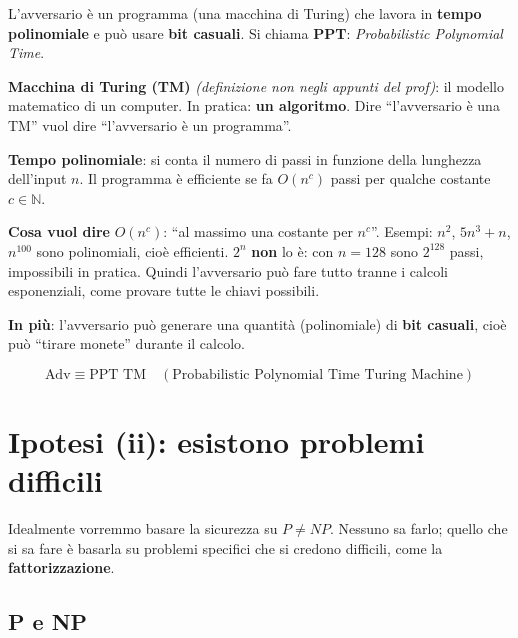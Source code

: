 \begin{inbreve}

L'avversario è un programma (una macchina di Turing) che lavora in \textbf{tempo polinomiale} e può usare \textbf{bit casuali}. Si chiama \textbf{PPT}: \emph{Probabilistic Polynomial Time}.

\end{inbreve}

\textbf{Macchina di Turing (TM)} \emph{(definizione non negli appunti del prof)}: il modello matematico di un computer. In pratica: \textbf{un algoritmo}. Dire ``l'avversario è una TM'' vuol dire ``l'avversario è un programma''.

\textbf{Tempo polinomiale}: si conta il numero di passi in funzione della lunghezza dell'input \(n\). Il programma è efficiente se fa \(O(n^c)\) passi per qualche costante \(c \in \mathbb{N}\).

\begin{nota}

\textbf{Cosa vuol dire} \(O(n^c)\): ``al massimo una costante per \(n^c\)''. Esempi: \(n^2\), \(5n^3 + n\), \(n^{100}\) sono polinomiali, cioè efficienti. \(2^n\) \textbf{non} lo è: con \(n = 128\) sono \(2^{128}\) passi, impossibili in pratica. Quindi l'avversario può fare tutto tranne i calcoli esponenziali, come provare tutte le chiavi possibili.

\end{nota}

\textbf{In più}: l'avversario può generare una quantità (polinomiale) di \textbf{bit casuali}, cioè può ``tirare monete'' durante il calcolo.

\[
\text{Adv} \equiv \text{PPT TM} \quad (\text{Probabilistic Polynomial Time Turing Machine})
\]

\section{Ipotesi (ii): esistono problemi difficili}

\begin{inbreve}

Idealmente vorremmo basare la sicurezza su \(P \neq NP\). Nessuno sa farlo; quello che si sa fare è basarla su problemi specifici che si credono difficili, come la \textbf{fattorizzazione}.

\end{inbreve}

\subsection{P e NP}

